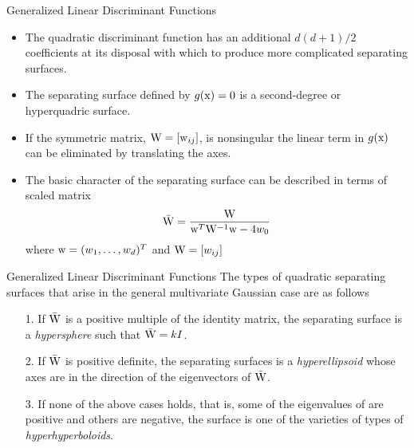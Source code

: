 \begin{frame}{Generalized Linear Discriminant Functions}
\begin{itemize}
\item The quadratic discriminant function has an additional $d(d+1)/2$ coefficients at its disposal with which to produce more complicated separating surfaces.
\item The separating surface defined by $g({\rm x})=0$ is a second-degree or hyperquadric surface.
\item If the symmetric matrix, ${\rm W} = [{\rm w}_{ij}]$, is nonsingular the linear term in $g({\rm x})$ can be eliminated by translating the axes. 
\item The basic character of the separating surface can be described in terms of scaled matrix
\begin{equation}
\bar{\rm W} = \frac{{\rm W}}{{{{\rm w}^T}{{\rm W}^{ - 1}}{\rm w} - 4{w_0}}} \nonumber
\end{equation}
where ${\rm w}=(w_1,\ldots,w_d)^T$ and ${\rm W}=[w_{ij}]$
\end{itemize}
\end{frame}

\begin{frame}{Generalized Linear Discriminant Functions}
The types of quadratic separating surfaces that arise in the general multivariate Gaussian case are as follows
\begin{itemize}
\item[1.] If $\bar{\rm W}$ is a positive multiple of the identity matrix, the separating surface is a \textit{\color{mycolor2}hypersphere} such that $\bar{\rm W}=kI$.
\item[2.] If $\bar{\rm W}$ is positive definite, the separating surfaces is a \textit{\color{mycolor3}hyperellipsoid} whose axes are in the direction of the eigenvectors of $\bar{\rm W}$.
\item[3.] If none of the above cases holds, that is, some of the eigenvalues of are positive and others are negative,
the surface is one of the varieties of types of \textit{\color{mycolor4}hyperhyperboloids}.
\end{itemize}
\end{frame}

